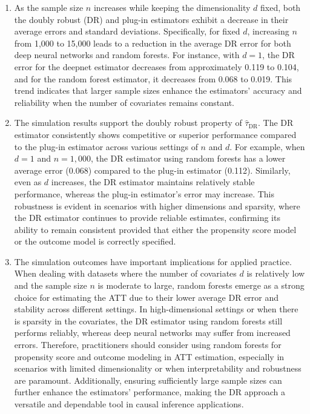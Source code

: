 \documentclass{article}
\begin{document}
\begin{enumerate}
  \item As the sample size \( n \) increases while keeping the dimensionality \( d \) fixed, both the doubly robust (DR) and plug-in estimators exhibit a decrease in their average errors and standard deviations. Specifically, for fixed \( d \), increasing \( n \) from 1,000 to 15,000 leads to a reduction in the average DR error for both deep neural networks and random forests. For instance, with \( d = 1 \), the DR error for the deepnet estimator decreases from approximately 0.119 to 0.104, and for the random forest estimator, it decreases from 0.068 to 0.019. This trend indicates that larger sample sizes enhance the estimators' accuracy and reliability when the number of covariates remains constant.

  \item The simulation results support the doubly robust property of \( \hat{\tau}_{\text{DR}} \). The DR estimator consistently shows competitive or superior performance compared to the plug-in estimator across various settings of \( n \) and \( d \). For example, when \( d = 1 \) and \( n = 1,000 \), the DR estimator using random forests has a lower average error (0.068) compared to the plug-in estimator (0.112). Similarly, even as \( d \) increases, the DR estimator maintains relatively stable performance, whereas the plug-in estimator's error may increase. This robustness is evident in scenarios with higher dimensions and sparsity, where the DR estimator continues to provide reliable estimates, confirming its ability to remain consistent provided that either the propensity score model or the outcome model is correctly specified.

  \item The simulation outcomes have important implications for applied practice. When dealing with datasets where the number of covariates \( d \) is relatively low and the sample size \( n \) is moderate to large, random forests emerge as a strong choice for estimating the ATT due to their lower average DR error and stability across different settings. In high-dimensional settings or when there is sparsity in the covariates, the DR estimator using random forests still performs reliably, whereas deep neural networks may suffer from increased errors. Therefore, practitioners should consider using random forests for propensity score and outcome modeling in ATT estimation, especially in scenarios with limited dimensionality or when interpretability and robustness are paramount. Additionally, ensuring sufficiently large sample sizes can further enhance the estimators' performance, making the DR approach a versatile and dependable tool in causal inference applications.
\end{enumerate}
\end{document}

